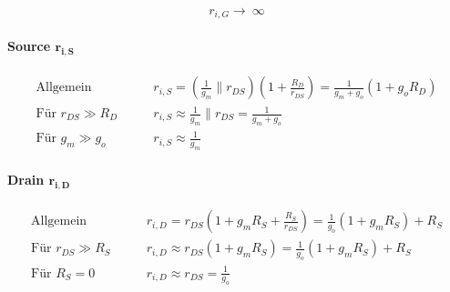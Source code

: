 \[
    r_{i, G} \to\ \infty
\]


\paragraph{Source $\bm{r_{i,S}}$}

\vspace{-0.3cm}

\begin{align*}
    \text{Allgemein}            & \qquad r_{i, S} = \left( \frac{1}{g_m} \parallel r_{DS} \right) \left( 1 + \frac{R_D}{r_{DS}} \right) = \frac{1}{g_m + g_o} (1 + g_o R_D) \\
    \text{Für } r_{DS} \gg R_D  & \qquad r_{i, S} \approx \frac{1}{g_m} \parallel r_{DS} = \frac{1}{g_m + g_o} \\
    \text{Für } g_m \gg g_o     & \qquad r_{i, S} \approx \frac{1}{g_m}
\end{align*}


\paragraph{Drain $\bm{r_{i,D}}$}

\vspace{-0.3cm}

\begin{align*}
    \text{Allgemein}            & \qquad r_{i, D} = r_{DS} \left( 1 + g_m R_S + \frac{R_S}{r_{DS}} \right) = \frac{1}{g_o} (1+g_m R_S) + R_S \\
    \text{Für } r_{DS} \gg R_S  & \qquad r_{i, D} \approx r_{DS} \left( 1 + g_m R_S \right) = \frac{1}{g_o} (1+g_m R_S) + R_S \\
    \text{Für } R_S = 0         & \qquad r_{i, D} \approx r_{DS} = \frac{1}{g_o}
\end{align*}

